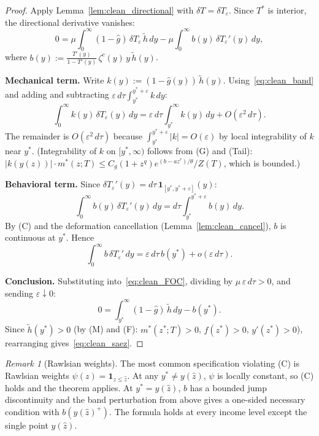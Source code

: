 \documentclass[12pt,a4paper]{article}
\theoremstyle{definition}
\theoremstyle{plain}
\theoremstyle{remark}
\newtheorem{remark}{Remark}[section]
\begin{document}
\begin{proof}
Apply Lemma~\ref{lem:clean_directional} with $\delta T = \delta T_\varepsilon$.  Since $T^*$ is interior, the directional derivative vanishes:
\begin{equation}
\label{eq:clean_FOC}
  0 = \mu\int_0^\infty (1-\hat g)\,\delta T_\varepsilon\,\widetilde{h}\,dy
  - \mu\int_0^\infty b(y)\,\delta T_\varepsilon'(y)\,dy,
\end{equation}
where $b(y) := \frac{T'(y)}{1-T'(y)}\,\zeta^c(y)\,y\,\widetilde{h}(y)$.

\medskip
\noindent\textbf{Mechanical term.}
Write $k(y) := (1-\hat g(y))\,\widetilde{h}(y)$.  Using~\eqref{eq:clean_band} and adding and subtracting $\varepsilon\,d\tau\int_{y^*}^{y^*+\varepsilon}k\,dy$:
\[
  \int_0^\infty k(y)\,\delta T_\varepsilon(y)\,dy
  = \varepsilon\,d\tau\int_{y^*}^\infty k(y)\,dy + O(\varepsilon^2\,d\tau).
\]
The remainder is $O(\varepsilon^2\,d\tau)$ because
$\int_{y^*}^{y^*+\varepsilon}|k| = O(\varepsilon)$ by local
integrability of $k$ near $y^*$.  (Integrability of $k$ on
$[y^*,\infty)$ follows from \textup{(G)} and
\textup{(Tail)}: $|k(y(z))|\cdot m^*(z;T) \le
C_g(1+z^q)e^{(b-az^r)/\theta}/Z(T)$, which is bounded.)

\medskip
\noindent\textbf{Behavioral term.}
Since $\delta T_\varepsilon'(y) = d\tau\,\mathbf{1}_{[y^*,y^*+\varepsilon]}(y)$:
\[
  \int_0^\infty b(y)\,\delta T_\varepsilon'(y)\,dy = d\tau\int_{y^*}^{y^*+\varepsilon}b(y)\,dy.
\]
By \textup{(C)} and the deformation cancellation (Lemma~\ref{lem:clean_cancel}), $b$ is continuous at $y^*$.  Hence
\[
  \int_0^\infty b\,\delta T_\varepsilon'\,dy = \varepsilon\,d\tau\,b(y^*) + o(\varepsilon\,d\tau).
\]

\medskip
\noindent\textbf{Conclusion.}
Substituting into~\eqref{eq:clean_FOC}, dividing by $\mu\,\varepsilon\,d\tau > 0$, and sending $\varepsilon \downarrow 0$:
\[
  0 = \int_{y^*}^\infty (1-\hat g)\,\widetilde{h}\,dy - b(y^*).
\]
Since $\widetilde{h}(y^*) > 0$ (by \textup{(M)} and \textup{(F)}: $m^*(z^*;T) > 0$, $f(z^*) > 0$, $y'(z^*) > 0$), rearranging gives~\eqref{eq:clean_saez}.
\end{proof}

\begin{remark}[Rawlsian weights]
\label{rem:clean_rawlsian}
The most common specification violating \textup{(C)} is Rawlsian weights $\psi(z) = \mathbf{1}_{z \le \hat z}$.  At any $y^* \neq y(\hat z)$, $\psi$ is locally constant, so \textup{(C)} holds and the theorem applies.  At $y^* = y(\hat z)$, $b$ has a bounded jump discontinuity and the band perturbation from above gives a one-sided necessary condition with $b(y(\hat z)^+)$.  The formula holds at every income level except the single point $y(\hat z)$.
\end{remark}
\end{document}
